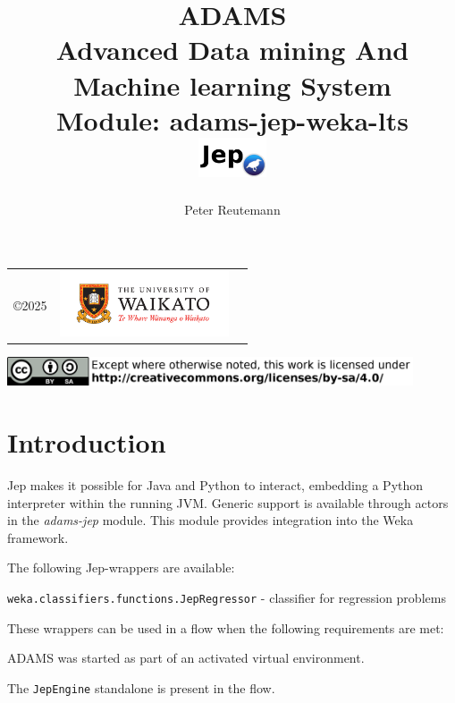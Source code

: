 \documentclass[a4paper]{book}
\title{
  \textbf{ADAMS} \\
  {\Large \textbf{A}dvanced \textbf{D}ata mining \textbf{A}nd \textbf{M}achine
  learning \textbf{S}ystem} \\
  {\Large Module: adams-jep-weka-lts} \\
  \vspace{1cm}
  \includegraphics[width=2cm]{images/jep-weka-lts-module.png} \\
}
\author{
  Peter Reutemann
}
\begin{document}
\begin{titlepage}
\maketitle

\thispagestyle{empty}
\center
\begin{table}[b]
	\begin{tabular}{c l l}
		\parbox[c][2cm]{2cm}{\copyright 2025} &
		\parbox[c][2cm]{5cm}{\includegraphics[width=5cm]{images/coat_of_arms.pdf}} \\
	\end{tabular}
	\includegraphics[width=12cm]{images/cc.png} \\
\end{table}

\end{titlepage}

\tableofcontents


\chapter{Introduction}
Jep\cite{jep} makes it possible for Java and Python to interact, embedding a Python
interpreter within the running JVM. Generic support is available through actors
in the \textit{adams-jep} module. This module provides integration into the Weka
framework.

\noindent The following Jep-wrappers are available:
\begin{tight_itemize}
    \item \texttt{weka.classifiers.functions.JepRegressor} - classifier for regression problems
\end{tight_itemize}

\noindent These wrappers can be used in a flow when the following requirements are met:
\begin{tight_itemize}
    \item ADAMS was started as part of an activated virtual environment.
    \item The \texttt{JepEngine} standalone is present in the flow.
\end{tight_itemize}



\end{document}
